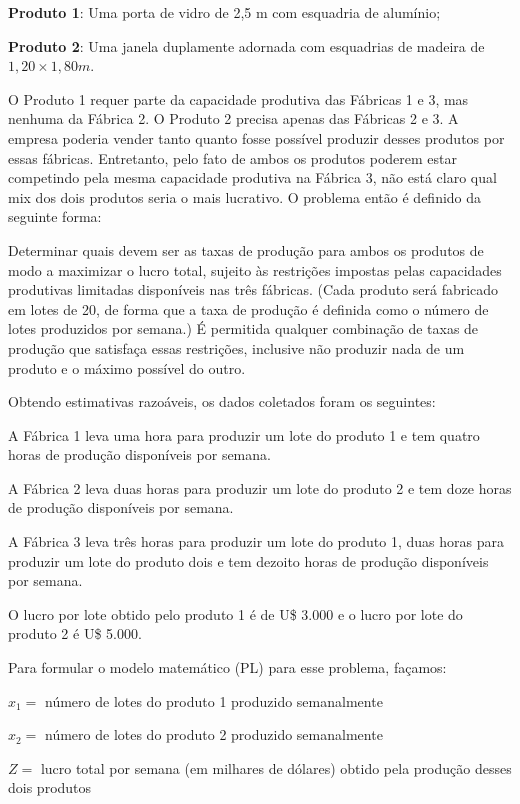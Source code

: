 \begin{alineas} 
\item[] \textbf{Produto 1}: Uma porta de vidro de 2,5 m com esquadria de alumínio;
\item[] \textbf{Produto 2}: Uma janela duplamente adornada com esquadrias de madeira de $1,20 \times 1,80 m$.
\end{alineas} 

O Produto 1 requer parte da capacidade produtiva das Fábricas 1 e 3, mas nenhuma da Fábrica 2. O Produto 2 precisa apenas das Fábricas 2 e 3. A empresa poderia vender tanto quanto fosse possível produzir desses produtos por essas fábricas. Entretanto, pelo fato de ambos os produtos poderem estar competindo pela mesma capacidade produtiva na Fábrica 3, não está claro qual mix dos dois produtos seria o mais lucrativo. O problema então é definido da seguinte forma: 

Determinar quais devem ser as taxas de produção para ambos os produtos de modo a maximizar o lucro total, sujeito às restrições impostas pelas capacidades produtivas limitadas disponíveis nas três fábricas. (Cada produto será fabricado em lotes de 20, de forma que a taxa de produção é definida como o número de lotes produzidos por semana.) É permitida qualquer combinação de taxas de produção que satisfaça essas restrições, inclusive não produzir nada de um produto e o máximo possível do outro. 

Obtendo estimativas razoáveis, os dados coletados foram os seguintes:

\begin{alineascomponto}
\item A Fábrica 1 leva uma hora para produzir um lote do produto 1 e tem quatro horas de produção disponíveis por semana.
\item A Fábrica 2 leva duas horas para produzir um lote do produto 2 e tem doze horas de produção disponíveis por semana.
\item A Fábrica 3 leva três horas para produzir um lote do produto 1, duas horas para produzir um lote do produto dois e tem dezoito horas de produção disponíveis por semana.
\item O lucro por lote obtido pelo produto 1 é de U\$ 3.000 e o lucro por lote do produto 2 é U\$ 5.000.
\end{alineascomponto}

Para formular o modelo matemático (PL) para esse problema, façamos:
\begin{alineas}
\item[] $x_1 =$ número de lotes do produto 1 produzido semanalmente
\item[] $x_2 =$ número de lotes do produto 2 produzido semanalmente
\item[] $Z =$ lucro total por semana (em milhares de dólares) obtido pela produção desses dois produtos
\end{alineas}

